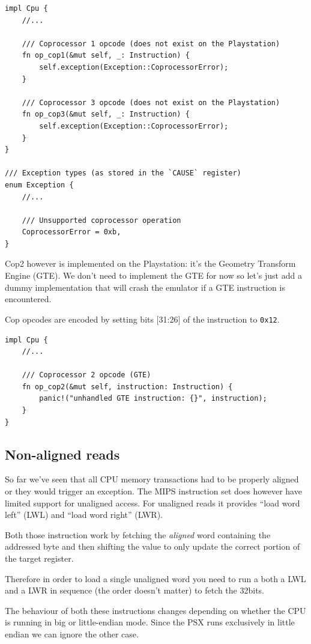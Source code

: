 \documentclass[a4paper]{article}
\newcommand{\code}[1] {\texttt{#1}}
\begin{document}
\begin{lstlisting}
impl Cpu {
    //...

    /// Coprocessor 1 opcode (does not exist on the Playstation)
    fn op_cop1(&mut self, _: Instruction) {
        self.exception(Exception::CoprocessorError);
    }

    /// Coprocessor 3 opcode (does not exist on the Playstation)
    fn op_cop3(&mut self, _: Instruction) {
        self.exception(Exception::CoprocessorError);
    }
}

/// Exception types (as stored in the `CAUSE` register)
enum Exception {
    //...

    /// Unsupported coprocessor operation
    CoprocessorError = 0xb,
}
\end{lstlisting}

Cop2 however is implemented on the Playstation: it's the Geometry
Transform Engine (GTE). We don't need to implement the GTE for now so
let's just add a dummy implementation that will crash the emulator if
a GTE instruction is encountered.

Cop opcodes are encoded by setting bits [31:26] of the
instruction to \code{0x12}.

\begin{lstlisting}
impl Cpu {
    //...

    /// Coprocessor 2 opcode (GTE)
    fn op_cop2(&mut self, instruction: Instruction) {
        panic!("unhandled GTE instruction: {}", instruction);
    }
}
\end{lstlisting}

\subsection{Non-aligned reads}

So far we've seen that all CPU memory transactions had to be properly
aligned or they would trigger an exception. The MIPS instruction set
does however have limited support for unaligned access. For unaligned
reads it provides ``load word left'' (LWL) and ``load word right''
(LWR).

Both those instruction work by fetching the \emph{aligned} word
containing the addressed byte and then shifting the value to only
update the correct portion of the target register.

Therefore in order to load a single unaligned word you need to run a
both a LWL and a LWR in sequence (the order doesn't matter) to fetch
the 32bits.

The behaviour of both these instructions changes depending on whether
the CPU is running in big or little-endian mode. Since the PSX runs
exclusively in little endian we can ignore the other case.
\end{document}
